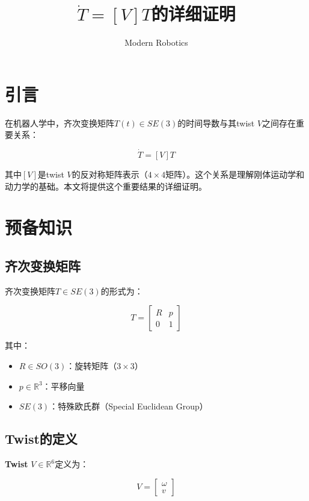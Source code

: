 \documentclass[12pt,a4paper]{article}
\title{$\dot{T} = [V]T$的详细证明}
\author{Modern Robotics}
\date{}
\begin{document}
\maketitle

\tableofcontents
\newpage

\section{引言}

在机器人学中，齐次变换矩阵$T(t) \in SE(3)$的时间导数与其twist $V$之间存在重要关系：

\begin{equation}
\dot{T} = [V] T
\label{eq:main_theorem}
\end{equation}

其中$[V]$是twist $V$的反对称矩阵表示（$4 \times 4$矩阵）。这个关系是理解刚体运动学和动力学的基础。本文将提供这个重要结果的详细证明。

\section{预备知识}

\subsection{齐次变换矩阵}

齐次变换矩阵$T \in SE(3)$的形式为：

\begin{equation}
T = \begin{bmatrix} R & p \\ 0 & 1 \end{bmatrix}
\end{equation}

其中：
\begin{itemize}
\item $R \in SO(3)$：旋转矩阵（$3 \times 3$）
\item $p \in \mathbb{R}^3$：平移向量
\item $SE(3)$：特殊欧氏群（Special Euclidean Group）
\end{itemize}

\subsection{Twist的定义}

\textbf{Twist} $V \in \mathbb{R}^6$定义为：

\begin{equation}
V = \begin{bmatrix} \omega \\ v \end{bmatrix}
\end{equation}
\end{document}
